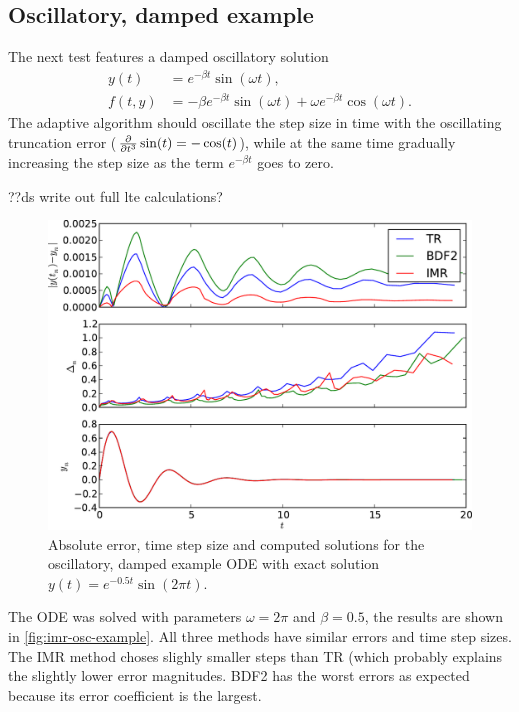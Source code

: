 \subsection{Oscillatory, damped example}
\label{sec:oscill-damp-example}

The next test features a damped oscillatory solution
\begin{equation}
  \label{eqn:imr-test-osc-damp}
  \begin{aligned}
    y(t) &= e^{-\beta t} \sin(\omega t), \\
    f(t,y) &= - \beta e^{-\beta t} \sin(\omega t) + \omega e^{-\beta t} \cos(\omega t).  \end{aligned}
\end{equation} 
The adaptive algorithm should oscillate the step size in time with the oscillating truncation error ($\frac{\partial }{\partial t^3} \sin(t) = -\cos(t)$), while at the same time gradually increasing the step size as the term $e^{-\beta t}$ goes to zero.

??ds write out full lte calculations?

\begin{figure}[\figpos]
  \centering \includegraphics[width=1\textwidth]{plots/aimr_odes/damped_oscillation-errornormsvs-dtsvs-tracevaluesvstimes}
  \caption{Absolute error, time step size and computed solutions for the oscillatory, damped example ODE with exact solution $y(t) = e^{-0.5t} \sin(2\pi t)$.}
  \label{fig:imr-osc-example}
\end{figure}

The ODE was solved with parameters $\omega = 2 \pi$ and $\beta = 0.5$, the results are shown in \autoref{fig:imr-osc-example}.
All three methods have similar errors and time step sizes.
The IMR method choses slighly smaller steps than TR (which probably explains the slightly lower error magnitudes.
BDF2 has the worst errors as expected because its error coefficient is the largest.

